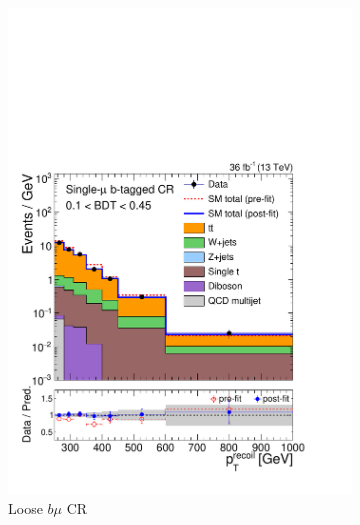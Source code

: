 \begin{figure}[]
\begin{center}
\begin{subfigure}[t]{0.24\textwidth}
            \includegraphics[width=\textwidth]{figures/monotop/postfit/stackedPostfit_singlemuontop_monotop_loose.pdf}
            \caption{Loose $b\mu$ CR}
        \end{subfigure}
        \begin{subfigure}[t]{0.24\textwidth}

\end{subfigure}
\end{center}
\end{figure}
